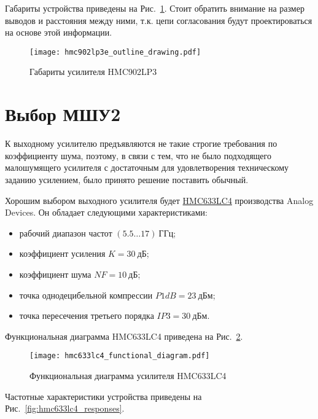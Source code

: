 Габариты устройства приведены на Рис.~\ref{fig:hmc902lp3e_outline_drawing}.
Стоит обратить внимание на размер выводов и расстояния между ними, т.к. цепи согласования будут проектироваться на основе этой информации.

\begin{figure}[!ht]
    \centering
    \texttt{[image: hmc902lp3e\_outline\_drawing.pdf]}
    \caption{Габариты усилителя HMC902LP3}%
    \label{fig:hmc902lp3e_outline_drawing}
\end{figure}

\section{Выбор МШУ2}

К выходному усилителю предъявляются не такие строгие требования по коэффициенту шума, поэтому, в связи с тем, что не было подходящего малошумящего усилителя с достаточным для удовлетворения техническому заданию усилением, было принято решение поставить обычный.

Хорошим выбором выходного усилителя будет \href{https://www.analog.com/en/products/hmc633lc4.html}{HMC633LC4} производства Analog Devices.
Он обладает следующими характеристиками:
\begin{itemize}
    \item
        рабочий диапазон частот $(5.5 \ldots 17)~\text{ГГц}$;
    \item
        коэффициент усиления $K = 30~\text{дБ}$;
    \item
        коэффициент шума $NF = 10~\text{дБ}$;
    \item
        точка однодецибельной компрессии $P1dB = 23~\text{дБм}$;
    \item
        точка пересечения третьего порядка $IP3 = 30~\text{дБм}$.
\end{itemize}

Функциональная диаграмма HMC633LC4 приведена на Рис.~\ref{fig:hmc633lc4_functional_diagram}.

\begin{figure}[!ht]
    \centering
    \texttt{[image: hmc633lc4\_functional\_diagram.pdf]}
    \caption{Функциональная диаграмма усилителя HMC633LC4}%
    \label{fig:hmc633lc4_functional_diagram}
\end{figure}

Частотные характеристики устройства приведены на Рис.~\ref{fig:hmc633lc4_responses}.

